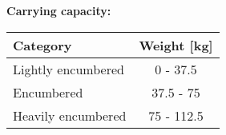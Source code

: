 \documentclass[11pt]{article}
\begin{document}
\vspace{10mm}

\textbf{Carrying capacity:} \\

	\begin{tabular}{l|c}
Category & Weight [kg] \\
\hline
Lightly encumbered 	& 0 - 37.5 	\\
Encumbered 			& 37.5 - 75 \\
Heavily encumbered	& 75 - 112.5
	\end{tabular}
\end{document}
